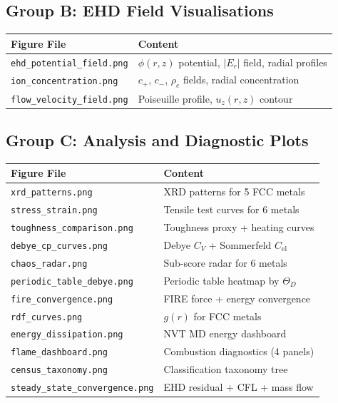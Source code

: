 \documentclass[11pt,a4paper]{article}
\begin{document}
\subsection{Group B: EHD Field Visualisations}

\begin{center}
\begin{tabular}{lp{8cm}}
\toprule
\textbf{Figure File} & \textbf{Content} \\
\midrule
\texttt{ehd\_potential\_field.png}  & $\phi(r,z)$ potential, $|E_r|$ field, radial profiles \\
\texttt{ion\_concentration.png}     & $c_+$, $c_-$, $\rho_e$ fields, radial concentration \\
\texttt{flow\_velocity\_field.png}  & Poiseuille profile, $u_z(r,z)$ contour \\
\bottomrule
\end{tabular}
\end{center}

\subsection{Group C: Analysis and Diagnostic Plots}

\begin{center}
\begin{tabular}{lp{8cm}}
\toprule
\textbf{Figure File} & \textbf{Content} \\
\midrule
\texttt{xrd\_patterns.png}               & XRD patterns for 5 FCC metals \\
\texttt{stress\_strain.png}              & Tensile test curves for 6 metals \\
\texttt{toughness\_comparison.png}       & Toughness proxy + heating curves \\
\texttt{debye\_cp\_curves.png}           & Debye $C_V$ + Sommerfeld $C_{\text{el}}$ \\
\texttt{chaos\_radar.png}               & Sub-score radar for 6 metals \\
\texttt{periodic\_table\_debye.png}      & Periodic table heatmap by $\Theta_D$ \\
\texttt{fire\_convergence.png}           & FIRE force + energy convergence \\
\texttt{rdf\_curves.png}                & $g(r)$ for FCC metals \\
\texttt{energy\_dissipation.png}         & NVT MD energy dashboard \\
\texttt{flame\_dashboard.png}            & Combustion diagnostics (4 panels) \\
\texttt{census\_taxonomy.png}            & Classification taxonomy tree \\
\texttt{steady\_state\_convergence.png}  & EHD residual + CFL + mass flow \\
\bottomrule
\end{tabular}
\end{center}
\end{document}
